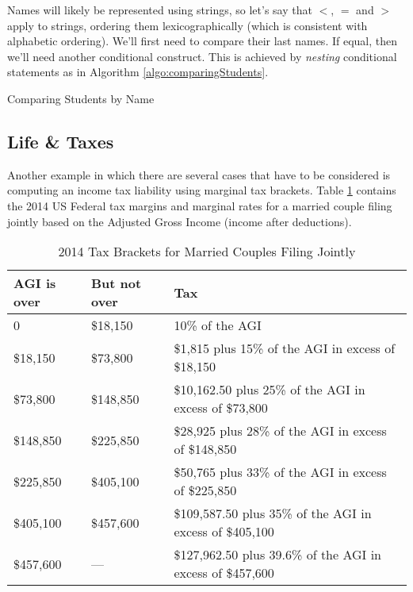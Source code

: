 Names will likely be represented using strings, so let's say that $<$, $=$ and $>$ apply
to strings, ordering them lexicographically (which is consistent with alphabetic ordering).
We'll first need to compare their last names.  If equal, then we'll need another conditional
construct.  This is achieved by  \emph{nesting} conditional statements as in Algorithm 
\ref{algo:comparingStudents}.


\begin{algorithm}[H]
\caption{Comparing Students by Name}
\label{algo:comparingStudents}
\end{algorithm}

\subsection{Life \& Taxes}
\label{subsubsection:lifeAndTaxes}

Another example in which there are several cases that have to be 
considered is computing an income tax liability using marginal tax brackets.  Table \ref{table:taxBrackets}
contains the 2014 US Federal tax margins and marginal rates for a married couple filing jointly based
on the Adjusted Gross Income (income after deductions).

\begin{table}[H]
\centering
\begin{tabular}{|l|l|p{}|}
\hline
AGI is over & But not over & Tax \\
\hline\hline
0 & \$18,150 & 10\% of the AGI\\
\hline
\$18,150 & \$73,800 & \$1,815 plus 15\% of the AGI in excess of \$18,150\\
\hline
\$73,800 & \$148,850 & \$10,162.50 plus 25\% of the AGI in excess of \$73,800\\
\hline
\$148,850 & \$225,850 & \$28,925 plus 28\% of the AGI in excess of \$148,850\\
\hline
\$225,850 & \$405,100 & \$50,765 plus 33\% of the AGI in excess of \$225,850\\
\hline
\$405,100 & \$457,600 & \$109,587.50 plus 35\% of the AGI in excess of \$405,100\\
\hline
\$457,600 & --- & \$127,962.50 plus 39.6\% of the AGI in excess of \$457,600\\
\hline
\end{tabular}
\caption{2014 Tax Brackets for Married Couples Filing Jointly}
\label{table:taxBrackets}
\end{table}

